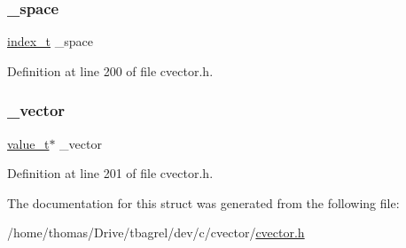 \mbox{\label{structcvector_a5948a8ef12921a8fc535fbcb48d4d4d4}} 
\subsubsection{\texorpdfstring{\+\_\+space}{\_space}}
{\footnotesize\ttfamily \hyperlink{cvector_8h_a05384666b24e4f096243ebf311436ee5}{index\+\_\+t} \+\_\+space}



Definition at line 200 of file cvector.\+h.

\mbox{\label{structcvector_ae60afc8a80c3a6c945520216265ebbe0}} 
\subsubsection{\texorpdfstring{\+\_\+vector}{\_vector}}
{\footnotesize\ttfamily \hyperlink{cvector_8h_a02cdeb70a219711c52cec8d6d682048b}{value\+\_\+t}$\ast$ \+\_\+vector}



Definition at line 201 of file cvector.\+h.



The documentation for this struct was generated from the following file\+:\begin{DoxyCompactItemize}
\item 
/home/thomas/\+Drive/tbagrel/dev/c/cvector/\hyperlink{cvector_8h}{cvector.\+h}\end{DoxyCompactItemize}
